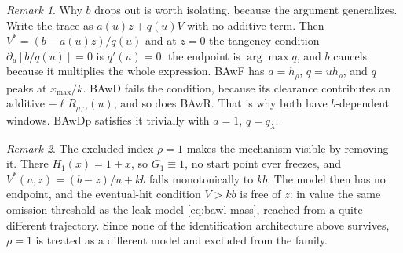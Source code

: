 \documentclass[12pt]{article}
\theoremstyle{remark}
\newtheorem{remark}{Remark}
\begin{document}
\begin{remark}
Why $b$ drops out is worth isolating, because the argument generalizes. Write the trace as $a(u)z + q(u)V$ with no additive term. Then $V^{*}=(b-a(u)z)/q(u)$ and at $z=0$ the tangency condition $\partial_u[b/q(u)]=0$ is $q'(u)=0$: the endpoint is $\arg\max q$, and $b$ cancels because it multiplies the whole expression. BAwF has $a=h_\rho$, $q=uh_\rho$, and $q$ peaks at $x_{\max}/k$. BAwD fails the condition, because its clearance contributes an additive $-\ell R_{\rho,\gamma}(u)$, and so does BAwR. That is why both have $b$-dependent windows. BAwDp satisfies it trivially with $a=1$, $q=q_\lambda$.
\end{remark}

\begin{remark}
The excluded index $\rho=1$ makes the mechanism visible by removing it. There $H_1(x)=1+x$, so $G_1\equiv1$, no start point ever freezes, and $V^{*}(u,z)=(b-z)/u+kb$ falls monotonically to $kb$. The model then has no endpoint, and the eventual-hit condition $V>kb$ is free of $z$: in value the same omission threshold as the leak model \eqref{eq:bawl-mass}, reached from a quite different trajectory. Since none of the identification architecture above survives, $\rho=1$ is treated as a different model and excluded from the family.
\end{remark}
\end{document}
